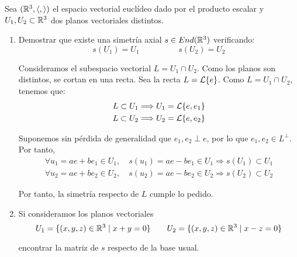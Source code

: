 \begin{ejercicio}
    Sea $(\mathbb{R}^3, \langle,\rangle)$ el espacio vectorial euclídeo dado por el producto escalar y $U_1,U_2\subset \mathbb{R}^3$ dos planos vectoriales distintos.
    \begin{enumerate}
        \item Demostrar que existe una simetría axial $s\in End(\mathbb{R}^3)$ verificando:
        \begin{equation*}
            s(U_1)=U_1 \hspace{2cm} s(U_2)=U_2
        \end{equation*}

        Consideramos el subespacio vectorial $L=U_1\cap U_2$. Como los planos son distintos, se cortan en una recta. Sea la recta $L=\mathcal{L}\{e\}$. Como $L=U_1\cap U_2$, tenemos que:
        \begin{gather*}
            L\subset U_1 \Longrightarrow U_1=\mathcal{L}\{e, e_1\} \\
            L\subset U_2 \Longrightarrow U_2=\mathcal{L}\{e, e_2\}
        \end{gather*}

        Suponemos sin pérdida de generalidad que $e_1,e_2\perp e$, por lo que $e_1,e_2\in L^\perp$. Por tanto,
        \begin{gather*}
            \forall u_1=ae+be_1\in U_1,\quad s(u_1)=ae-be_1\in U_1 \Longrightarrow s(U_1)\subset U_1 \\
            \forall u_2=ae+be_2\in U_2,\quad s(u_2)=ae-be_2\in U_2 \Longrightarrow s(U_2)\subset U_2
        \end{gather*}

        Por tanto, la simetría respecto de $L$ cumple lo pedido.


        \item Si consideramos los planos vectoriales
        \begin{equation*}
            U_1 = \{(x, y, z) \in \mathbb{R}^3 \mid x + y = 0\}
            \qquad
            U_2 = \{(x, y, z) \in \mathbb{R}^3 \mid x - z = 0\}
        \end{equation*}

        encontrar la matriz de $s$ respecto de la base usual.


\end{enumerate}
\end{ejercicio}
